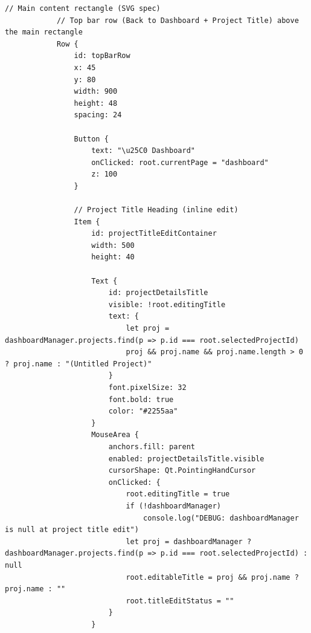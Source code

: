 \documentclass{report}
\begin{document}
\begin{lstlisting}[style=qmlstyle]
            // Main content rectangle (SVG spec)
            // Top bar row (Back to Dashboard + Project Title) above the main rectangle
            Row {
                id: topBarRow
                x: 45
                y: 80
                width: 900
                height: 48
                spacing: 24

                Button {
                    text: "\u25C0 Dashboard"
                    onClicked: root.currentPage = "dashboard"
                    z: 100
                }

                // Project Title Heading (inline edit)
                Item {
                    id: projectTitleEditContainer
                    width: 500
                    height: 40

                    Text {
                        id: projectDetailsTitle
                        visible: !root.editingTitle
                        text: {
                            let proj = dashboardManager.projects.find(p => p.id === root.selectedProjectId)
                            proj && proj.name && proj.name.length > 0 ? proj.name : "(Untitled Project)"
                        }
                        font.pixelSize: 32
                        font.bold: true
                        color: "#2255aa"
                    }
                    MouseArea {
                        anchors.fill: parent
                        enabled: projectDetailsTitle.visible
                        cursorShape: Qt.PointingHandCursor
                        onClicked: {
                            root.editingTitle = true
                            if (!dashboardManager)
                                console.log("DEBUG: dashboardManager is null at project title edit")
                            let proj = dashboardManager ? dashboardManager.projects.find(p => p.id === root.selectedProjectId) : null
                            root.editableTitle = proj && proj.name ? proj.name : ""
                            root.titleEditStatus = ""
                        }
                    }


\end{lstlisting}
\end{document}
